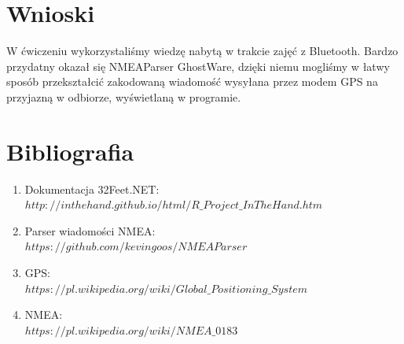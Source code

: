 \documentclass[12pt,a4paper,notitlepage]{report}
\begin{document}
\section{Wnioski}
W ćwiczeniu wykorzystaliśmy wiedzę nabytą w trakcie zajęć z Bluetooth. Bardzo przydatny okazał się NMEAParser GhostWare, dzięki niemu mogliśmy w łatwy sposób przekształcić zakodowaną wiadomość wysyłana przez modem GPS na przyjazną w odbiorze, wyświetlaną w programie.
\section{Bibliografia}
\begin{enumerate}
\item Dokumentacja 32Feet.NET:\\$http://inthehand.github.io/html/R\_Project\_InTheHand.htm$
\item Parser wiadomości NMEA:\\$https://github.com/kevingoos/NMEAParser$
\item GPS:\\$https://pl.wikipedia.org/wiki/Global\_Positioning\_System$
\item NMEA:\\$https://pl.wikipedia.org/wiki/NMEA\_0183$

\end{enumerate}
\end{document}
